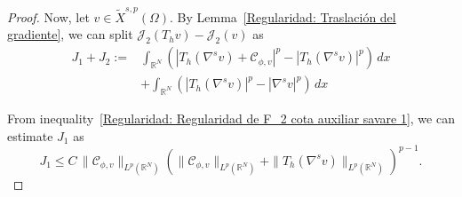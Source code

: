 \documentclass[]{amsart}
\theoremstyle{definition}
\theoremstyle{definition}
\theoremstyle{remark}
\numberwithin{equation}{section}
\newcommand{\grads}{\nabla^{s}}
\begin{document}
\begin{proof}
%	
%
	
 Now, let \( v \in \widetilde{X}^{s,p}(\Omega) \). By Lemma~\ref{Regularidad: Traslación del gradiente}, 
 we can split $\mathcal{J}_2(T_h v) - \mathcal{J}_2(v)$ as
\[
\begin{aligned}
	  J_1 + J_2 :=& \int_{\mathbb{R}^N} \left( \left|T_h(\grads v) + \mathcal{C}_{\phi,v}\right|^p - \left|T_h(\grads v)\right|^p  \right)\, dx \\ &+ \int_{\mathbb{R}^N } \left(\left|T_h(\grads v)\right|^p - \left|\grads v\right|^p \right)\, dx   
\end{aligned}
\]

From inequality~\eqref{Regularidad: Regularidad de F_2 cota auxiliar savare 1}, we can estimate \( J_1 \) as
\[
J_1 \leq C\,\|\mathcal{C}_{\phi,v}\|_{L^p(\mathbb{R}^N)}\left( \|\mathcal{C}_{\phi,v}\|_{L^p(\mathbb{R}^N)} + \|T_h(\grads v)\|_{L^p(\mathbb{R}^N)}\right)^{p-1}.
\]


\end{proof}
\end{document}
